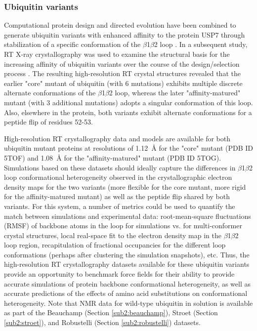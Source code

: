 \documentclass[9pt,review,pubversion]{livecoms}
\begin{document}
\subsubsection{Ubiquitin variants}
\label{sub2:ubiquitin}

Computational protein design and directed evolution have been combined to generate ubiquitin variants with enhanced affinity to the protein USP7 through stabilization of a specific conformation of the $\beta$1$\beta$2 loop \cite{zhang_conformational_2013}.
In a subsequent study, RT X-ray crystallography was used to examine the structural basis for the increasing affinity of ubiquitin variants over the course of the design/selection process \cite{biel_flexibility_2017}.
The resulting high-resolution RT crystal structures revealed that the earlier "core" mutant of ubiquitin (with 6 mutations) exhibits multiple discrete alternate conformations of the $\beta$1$\beta$2 loop, whereas the later "affinity-matured" mutant (with 3 additional mutations) adopts a singular conformation of this loop.
Also, elsewhere in the protein, both variants exhibit alternate conformations for a peptide flip of residues 52-53.

High-resolution RT crystallography data and models are available for both ubiquitin mutant proteins at resolutions of \qty{1.12}{\angstrom} for the "core" mutant (PDB ID 5TOF) and \qty{1.08}{\angstrom} for the "affinity-matured" mutant (PDB ID 5TOG).
Simulations based on these datasets should ideally capture the differences in $\beta$1$\beta$2 loop conformational heterogeneity observed in the crystallographic electron density maps for the two variants (more flexible for the core mutant, more rigid for the affinity-matured mutant) as well as the peptide flip shared by both variants.
For this system, a number of metrics could be used to quantify the match between simulations and experimental data: root-mean-square fluctuations (RMSF) of backbone atoms in the loop for simulations vs. for multi-conformer crystal structures, local real-space fit to the electron density map in the $\beta$1$\beta$2 loop region, recapitulation of fractional occupancies for the different loop conformations (perhaps after clustering the simulation snapshots), etc.
Thus, the high-resolution RT crystallography datasets available for these ubiquitin variants provide an opportunity to benchmark force fields for their ability to provide accurate simulations of protein backbone conformational heterogeneity, as well as accurate predictions of the effects of amino acid substitutions on conformational heterogeneity.
Note that NMR data for wild-type ubiquitin in solution is available as part of the Beauchamp (Section \ref{sub2:beauchamp}), Stroet (Section \ref{sub2:stroet}), and Robustelli (Section \ref{sub2:robustelli}) datasets.
\end{document}
